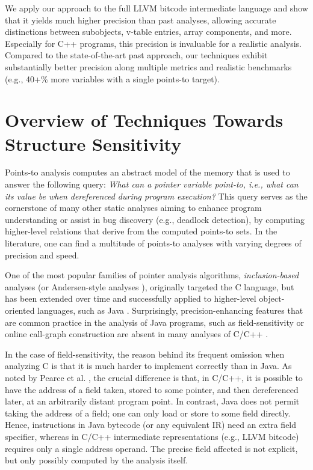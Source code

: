
We apply our approach to the full LLVM bitcode intermediate language
and show that it yields much higher precision than past analyses,
allowing accurate distinctions between subobjects, v-table entries,
array components, and more. Especially for C++ programs, this
precision is invaluable for a realistic analysis. Compared to the
state-of-the-art past approach, our techniques exhibit substantially
better precision along multiple metrics and realistic benchmarks
(e.g., 40+\% more variables with a single points-to target).


\section{Overview of Techniques Towards Structure Sensitivity}
\label{structsens/sect/overview}

Points-to analysis computes an abstract model of the memory that is
used to answer the following query: \emph{What can a pointer variable
  point-to, i.e., what can its value be when dereferenced during
  program execution?}  This query serves as the cornerstone of
many other static analyses aiming to enhance program understanding or
assist in bug discovery (e.g., deadlock detection), by computing
higher-level relations that derive from the computed points-to
sets. In the literature, one can find a multitude of points-to
analyses with varying degrees of precision and speed.

One of the most popular families of pointer analysis algorithms,
\emph{inclusion-based} analyses (or Andersen-style analyses
\cite{andersen:thesis}), originally targeted the C language, but has
been extended over time and successfully applied to higher-level
object-oriented languages, such as Java
\cite{pldi/BerndlLQHU03,oopsla/BravenboerS09,issta/MilanovaRR02,oopsla/RountevMR01,oopsla/WhaleyR99}.
Surprisingly, precision-enhancing features that are common practice in
the analysis of Java programs, such as field-sensitivity or online
call-graph construction are absent in many analyses of C/C++
\cite{antgrasshopper,toplas/HindBCC99,popl/ZhengR08,pldi/HeintzeT01a,pldi/Das00,sas/HardekopfL07}.


In the case of field-sensitivity, the reason behind its frequent
omission when analyzing C is that it is much harder to implement
correctly than in Java. As noted by Pearce et
al. \cite{toplas/PearceKH07}, the crucial difference is that, in C/C++,
it is possible to have the address of a field taken, stored to some
pointer, and then dereferenced later, at an arbitrarily distant
program point. In contrast, Java does not permit taking the address of
a field; one can only load or store to some field directly. Hence,
 instructions in Java bytecode (or any equivalent IR)
need an extra field specifier, whereas in C/C++ intermediate
representations (e.g., LLVM bitcode)  requires only a
single address operand. The precise field affected is not explicit, but
only possibly computed by the analysis itself.

